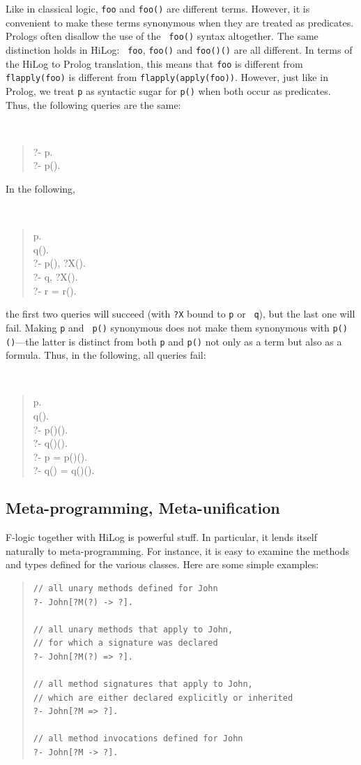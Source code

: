 \documentclass[11pt]{article}
\newcommand{\fl}{\mbox{F-logic}\xspace}
\begin{document}
%
Like in classical logic, {\tt foo} and {\tt foo()} are different terms.
However, it is convenient to make these terms synonymous
when they
are treated as predicates. Prologs often disallow the use of the {\tt
  foo()} syntax altogether.  The same distinction holds in HiLog: {\tt
  foo}, {\tt foo()} and {\tt foo()()} are all different. In terms of the
HiLog to Prolog translation, this means that {\tt foo} is different from
{\tt flapply(foo)} is different from {\tt flapply(apply(foo))}.  However, just
like in Prolog, we treat {\tt p} as syntactic sugar for {\tt p()} when both
occur as predicates. Thus, the following queries are the same:
{\tt
\begin{quote}
  ?- p.\\
  ?- p().
\end{quote}
}
\noindent
In the following,
{\tt
\begin{quote}
 p. \\
 q().\\
 ?- p(), ?X().\\
 ?- q, ?X().\\
 ?- r = r().
\end{quote}
}
\noindent
the first two queries will succeed (with {\tt ?X} bound to {\tt p} or {\tt
  q}), but the last one will fail.  Making {\tt p} and {\tt
  p()} synonymous does not make them synonymous with {\tt p()()}---the
latter is distinct from both {\tt p}
and {\tt p()} not only as a term but also as a formula. Thus, in the
following, all queries fail:
{\tt
\begin{quote}
 p.\\
 q().\\
 ?- p()().\\
 ?- q()().\\
 ?- p = p()().\\
 ?- q() = q()().
\end{quote}
}


\subsection{Meta-programming, Meta-unification}
\label{sec-meta-reification}


%
\fl together with HiLog is powerful stuff. In particular, it lends itself
naturally to meta-programming. For instance, it is easy to examine the
methods and types defined for the various classes.  Here are some simple
examples:
\begin{quote}
\begin{verbatim}
// all unary methods defined for John
?- John[?M(?) -> ?].

// all unary methods that apply to John,
// for which a signature was declared
?- John[?M(?) => ?].

// all method signatures that apply to John,
// which are either declared explicitly or inherited
?- John[?M => ?].

// all method invocations defined for John
?- John[?M -> ?].
\end{verbatim}
\end{quote}
\end{document}
